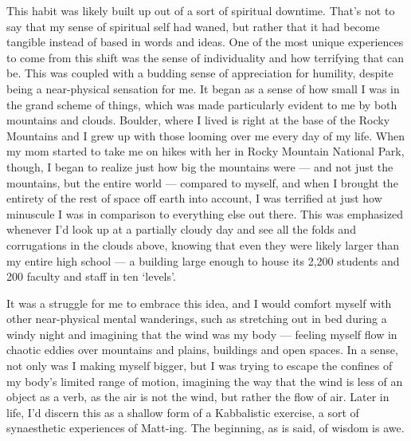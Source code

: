 This habit was likely built up out of a sort of spiritual downtime. That's not to say that my sense of spiritual self had waned, but rather that it had become tangible instead of based in words and ideas. One of the most unique experiences to come from this shift was the sense of individuality and how terrifying that can be. This was coupled with a budding sense of appreciation for humility, despite being a near-physical sensation for me. It began as a sense of how small I was in the grand scheme of things, which was made particularly evident to me by both mountains and clouds. Boulder, where I lived is right at the base of the Rocky Mountains and I grew up with those looming over me every day of my life. When my mom started to take me on hikes with her in Rocky Mountain National Park, though, I began to realize just how big the mountains were --- and not just the mountains, but the entire world --- compared to myself, and when I brought the entirety of the rest of space off earth into account, I was terrified at just how minuscule I was in comparison to everything else out there. This was emphasized whenever I'd look up at a partially cloudy day and see all the folds and corrugations in the clouds above, knowing that even they were likely larger than my entire high school --- a building large enough to house its 2,200 students and 200 faculty and staff in ten `levels'.

It was a struggle for me to embrace this idea, and I would comfort myself with other near-physical mental wanderings, such as stretching out in bed during a windy night and imagining that the wind was my body --- feeling myself flow in chaotic eddies over mountains and plains, buildings and open spaces. In a sense, not only was I making myself bigger, but I was trying to escape the confines of my body's limited range of motion, imagining the way that the wind is less of an object as a verb, as the air is not the wind, but rather the flow of air. Later in life, I'd discern this as a shallow form of a Kabbalistic exercise, a sort of synaesthetic experiences of Matt-ing. The beginning, as is said, of wisdom is awe.

